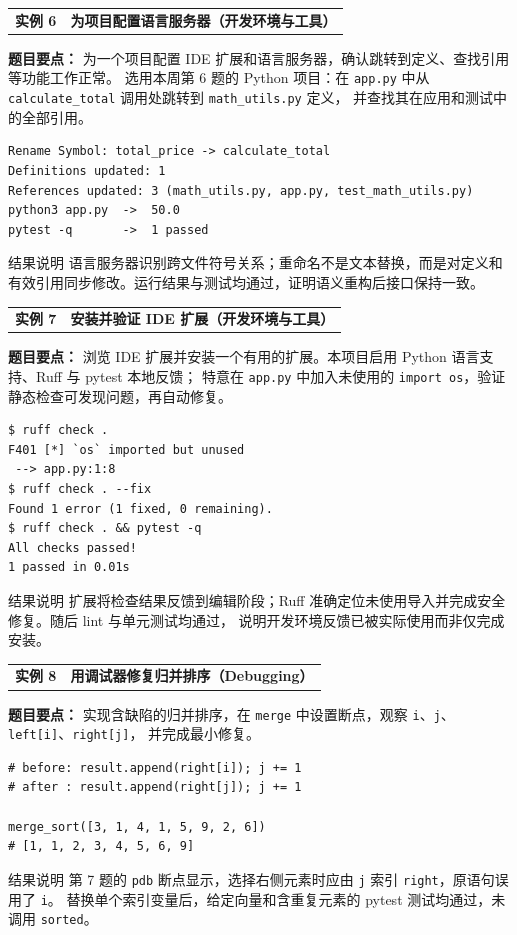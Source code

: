 \documentclass[UTF8,zihao=-4]{ctexart}
\newcommand{\practicebanner}[2]{
  \begin{tcolorbox}[
    colback=soft,
    colframe=navy,
    boxrule=1pt,
    arc=2mm,
    left=4mm,right=4mm,top=2.5mm,bottom=2.5mm]
    \begin{tabularx}{\textwidth}{>{\Large\bfseries\color{navy}}p{2.7cm}X}
      实例 #1 & {\large\bfseries\color{navy}#2}
    \end{tabularx}
  \end{tcolorbox}
}
\begin{document}
\vspace{0.5cm}
\practicebanner{6}{为项目配置语言服务器（开发环境与工具）}
\textbf{题目要点：} 为一个项目配置 IDE 扩展和语言服务器，确认跳转到定义、查找引用等功能工作正常。
选用本周第 6 题的 Python 项目：在 \texttt{app.py} 中从 \texttt{calculate\_total} 调用处跳转到 \texttt{math\_utils.py} 定义，
并查找其在应用和测试中的全部引用。
\begin{lstlisting}[style=output]
Rename Symbol: total_price -> calculate_total
Definitions updated: 1
References updated: 3 (math_utils.py, app.py, test_math_utils.py)
python3 app.py  ->  50.0
pytest -q       ->  1 passed
\end{lstlisting}
\begin{summarybox}{结果说明}
语言服务器识别跨文件符号关系；重命名不是文本替换，而是对定义和有效引用同步修改。运行结果与测试均通过，证明语义重构后接口保持一致。
\end{summarybox}

\clearpage
\practicebanner{7}{安装并验证 IDE 扩展（开发环境与工具）}
\textbf{题目要点：} 浏览 IDE 扩展并安装一个有用的扩展。本项目启用 Python 语言支持、Ruff 与 pytest 本地反馈；
特意在 \texttt{app.py} 中加入未使用的 \texttt{import os}，验证静态检查可发现问题，再自动修复。
\begin{lstlisting}[style=shell]
$ ruff check .
F401 [*] `os` imported but unused
 --> app.py:1:8
$ ruff check . --fix
Found 1 error (1 fixed, 0 remaining).
$ ruff check . && pytest -q
All checks passed!
1 passed in 0.01s
\end{lstlisting}
\begin{summarybox}{结果说明}
扩展将检查结果反馈到编辑阶段；Ruff 准确定位未使用导入并完成安全修复。随后 lint 与单元测试均通过，
说明开发环境反馈已被实际使用而非仅完成安装。
\end{summarybox}

\vspace{0.5cm}
\practicebanner{8}{用调试器修复归并排序（Debugging）}
\textbf{题目要点：} 实现含缺陷的归并排序，在 \texttt{merge} 中设置断点，观察 \texttt{i}、\texttt{j}、\texttt{left[i]}、\texttt{right[j]}，
并完成最小修复。
\begin{lstlisting}[style=python]
# before: result.append(right[i]); j += 1
# after : result.append(right[j]); j += 1

merge_sort([3, 1, 4, 1, 5, 9, 2, 6])
# [1, 1, 2, 3, 4, 5, 6, 9]
\end{lstlisting}
\begin{summarybox}{结果说明}
第 7 题的 \texttt{pdb} 断点显示，选择右侧元素时应由 \texttt{j} 索引 \texttt{right}，原语句误用了 \texttt{i}。
替换单个索引变量后，给定向量和含重复元素的 pytest 测试均通过，未调用 \texttt{sorted}。
\end{summarybox}
\end{document}
